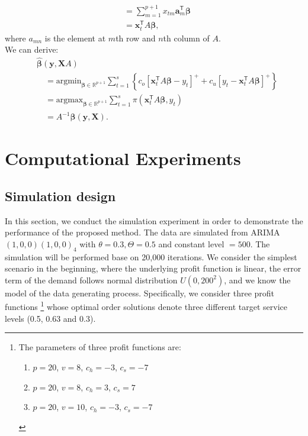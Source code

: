 \documentclass{article}
\begin{document}
\begin{itemize}
\[\begin{aligned}
            &=\displaystyle\sum_{m=1}^{p+1}x_{tm}\mathbf{a}_m^{\mathsf{T}}\boldsymbol{\beta}\\
            &=\mathbf{x}_t^{\mathsf{T}}A\boldsymbol{\beta},
        \end{aligned}
    \]
    where $a_{mn}$ is the element at $m$th row and $n$th column of $A$.\\
    We can derive:
    \[
        \begin{aligned}
            &\hat{\boldsymbol{\beta}}(\mathbf{y},\mathbf{X}A)\\
            &\quad=\text{argmin}_{\boldsymbol{\beta}\in \mathbb{R}^{p+1}}\displaystyle\sum_{t=1}^s{\left\{c_o\left[\mathbf{x}_t^{\mathsf{T}}A\boldsymbol{\beta}-y_t\right]^{+}+c_u\left[y_t-\mathbf{x}_t^{\mathsf{T}}A\boldsymbol{\beta}\right]^{+}\right\}}\\
            &\quad=\text{argmax}_{\boldsymbol{\beta}\in \mathbb{R}^{p+1}}\displaystyle\sum_{t=1}^s{\pi(\mathbf{x}_t^{\mathsf{T}}A\boldsymbol{\beta},y_t)}\\
            &\quad=A^{-1}\hat{\boldsymbol{\beta}}(\mathbf{y},\mathbf{X}).
        \end{aligned}
    \]
    
\end{itemize}



\section{Computational Experiments} \label{se:results}

\subsection{Simulation design}

In this section, we conduct the simulation experiment in order to demonstrate the performance of the proposed method. The data are simulated from ARIMA $(1,0,0)(1,0,0)_4$ with $\theta=0.3,\Theta=0.5$ and constant level $=500$. The simulation will be performed base on 20,000 iterations. We consider the simplest scenario in the beginning, where the underlying profit function is linear, the error term of the demand follows normal distribution $U(0,200^2)$, and we know the model of the data generating process. Specifically, we consider three profit functions \footnote{
The parameters of three profit functions are:
\begin{enumerate}
    \item $p=20$, $v=8$, $c_h=-3$, $c_s=-7$
    \item $p=20$, $v=8$, $c_h=3$, $c_s=7$
    \item $p=20$, $v=10$, $c_h=-3$, $c_s=-7$
\end{enumerate}
} whose optimal order solutions denote three different target service levels (0.5, 0.63 and 0.3).
\end{document}

